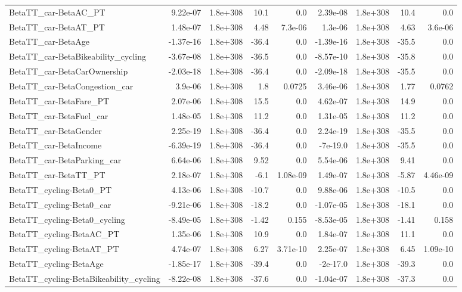 \begin{tabular}{lrrrrrrrr}
BetaTT_car-BetaAC_PT & 9.22e-07 & 1.8e+308 & 10.1 & 0.0 & 2.39e-08 & 1.8e+308 & 10.4 & 0.0 \\
BetaTT_car-BetaAT_PT & 1.48e-07 & 1.8e+308 & 4.48 & 7.3e-06 & 1.3e-06 & 1.8e+308 & 4.63 & 3.6e-06 \\
BetaTT_car-BetaAge & -1.37e-16 & 1.8e+308 & -36.4 & 0.0 & -1.39e-16 & 1.8e+308 & -35.5 & 0.0 \\
BetaTT_car-BetaBikeability_cycling & -3.67e-08 & 1.8e+308 & -36.5 & 0.0 & -8.57e-10 & 1.8e+308 & -35.8 & 0.0 \\
BetaTT_car-BetaCarOwnership & -2.03e-18 & 1.8e+308 & -36.4 & 0.0 & -2.09e-18 & 1.8e+308 & -35.5 & 0.0 \\
BetaTT_car-BetaCongestion_car & 3.9e-06 & 1.8e+308 & 1.8 & 0.0725 & 3.46e-06 & 1.8e+308 & 1.77 & 0.0762 \\
BetaTT_car-BetaFare_PT & 2.07e-06 & 1.8e+308 & 15.5 & 0.0 & 4.62e-07 & 1.8e+308 & 14.9 & 0.0 \\
BetaTT_car-BetaFuel_car & 1.48e-05 & 1.8e+308 & 11.2 & 0.0 & 1.31e-05 & 1.8e+308 & 11.2 & 0.0 \\
BetaTT_car-BetaGender & 2.25e-19 & 1.8e+308 & -36.4 & 0.0 & 2.24e-19 & 1.8e+308 & -35.5 & 0.0 \\
BetaTT_car-BetaIncome & -6.39e-19 & 1.8e+308 & -36.4 & 0.0 & -7e-19.0 & 1.8e+308 & -35.5 & 0.0 \\
BetaTT_car-BetaParking_car & 6.64e-06 & 1.8e+308 & 9.52 & 0.0 & 5.54e-06 & 1.8e+308 & 9.41 & 0.0 \\
BetaTT_car-BetaTT_PT & 2.18e-07 & 1.8e+308 & -6.1 & 1.08e-09 & 1.49e-07 & 1.8e+308 & -5.87 & 4.46e-09 \\
BetaTT_cycling-Beta0_PT & 4.13e-06 & 1.8e+308 & -10.7 & 0.0 & 9.88e-06 & 1.8e+308 & -10.5 & 0.0 \\
BetaTT_cycling-Beta0_car & -9.21e-06 & 1.8e+308 & -18.2 & 0.0 & -1.07e-05 & 1.8e+308 & -18.1 & 0.0 \\
BetaTT_cycling-Beta0_cycling & -8.49e-05 & 1.8e+308 & -1.42 & 0.155 & -8.53e-05 & 1.8e+308 & -1.41 & 0.158 \\
BetaTT_cycling-BetaAC_PT & 1.35e-06 & 1.8e+308 & 10.9 & 0.0 & 1.84e-07 & 1.8e+308 & 11.1 & 0.0 \\
BetaTT_cycling-BetaAT_PT & 4.74e-07 & 1.8e+308 & 6.27 & 3.71e-10 & 2.25e-07 & 1.8e+308 & 6.45 & 1.09e-10 \\
BetaTT_cycling-BetaAge & -1.85e-17 & 1.8e+308 & -39.4 & 0.0 & -2e-17.0 & 1.8e+308 & -39.3 & 0.0 \\
BetaTT_cycling-BetaBikeability_cycling & -8.22e-08 & 1.8e+308 & -37.6 & 0.0 & -1.04e-07 & 1.8e+308 & -37.3 & 0.0 \\

\end{tabular}
